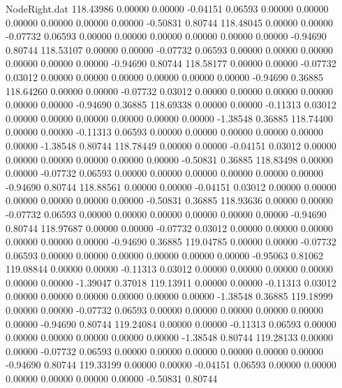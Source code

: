 \begin{filecontents}{NodeRight.dat}
 118.43986    0.00000    0.00000    -0.04151    0.06593    0.00000    0.00000    0.00000    0.00000    0.00000    0.00000   -0.50831    0.80744
 118.48045    0.00000    0.00000    -0.07732    0.06593    0.00000    0.00000    0.00000    0.00000    0.00000    0.00000   -0.94690    0.80744
 118.53107    0.00000    0.00000    -0.07732    0.06593    0.00000    0.00000    0.00000    0.00000    0.00000    0.00000   -0.94690    0.80744
 118.58177    0.00000    0.00000    -0.07732    0.03012    0.00000    0.00000    0.00000    0.00000    0.00000    0.00000   -0.94690    0.36885
 118.64260    0.00000    0.00000    -0.07732    0.03012    0.00000    0.00000    0.00000    0.00000    0.00000    0.00000   -0.94690    0.36885
 118.69338    0.00000    0.00000    -0.11313    0.03012    0.00000    0.00000    0.00000    0.00000    0.00000    0.00000   -1.38548    0.36885
 118.74400    0.00000    0.00000    -0.11313    0.06593    0.00000    0.00000    0.00000    0.00000    0.00000    0.00000   -1.38548    0.80744
 118.78449    0.00000    0.00000    -0.04151    0.03012    0.00000    0.00000    0.00000    0.00000    0.00000    0.00000   -0.50831    0.36885
 118.83498    0.00000    0.00000    -0.07732    0.06593    0.00000    0.00000    0.00000    0.00000    0.00000    0.00000   -0.94690    0.80744
 118.88561    0.00000    0.00000    -0.04151    0.03012    0.00000    0.00000    0.00000    0.00000    0.00000    0.00000   -0.50831    0.36885
 118.93636    0.00000    0.00000    -0.07732    0.06593    0.00000    0.00000    0.00000    0.00000    0.00000    0.00000   -0.94690    0.80744
 118.97687    0.00000    0.00000    -0.07732    0.03012    0.00000    0.00000    0.00000    0.00000    0.00000    0.00000   -0.94690    0.36885
 119.04785    0.00000    0.00000    -0.07732    0.06593    0.00000    0.00000    0.00000    0.00000    0.00000    0.00000   -0.95063    0.81062
 119.08844    0.00000    0.00000    -0.11313    0.03012    0.00000    0.00000    0.00000    0.00000    0.00000    0.00000   -1.39047    0.37018
 119.13911    0.00000    0.00000    -0.11313    0.03012    0.00000    0.00000    0.00000    0.00000    0.00000    0.00000   -1.38548    0.36885
 119.18999    0.00000    0.00000    -0.07732    0.06593    0.00000    0.00000    0.00000    0.00000    0.00000    0.00000   -0.94690    0.80744
 119.24084    0.00000    0.00000    -0.11313    0.06593    0.00000    0.00000    0.00000    0.00000    0.00000    0.00000   -1.38548    0.80744
 119.28133    0.00000    0.00000    -0.07732    0.06593    0.00000    0.00000    0.00000    0.00000    0.00000    0.00000   -0.94690    0.80744
 119.33199    0.00000    0.00000    -0.04151    0.06593    0.00000    0.00000    0.00000    0.00000    0.00000    0.00000   -0.50831    0.80744

\end{filecontents}
